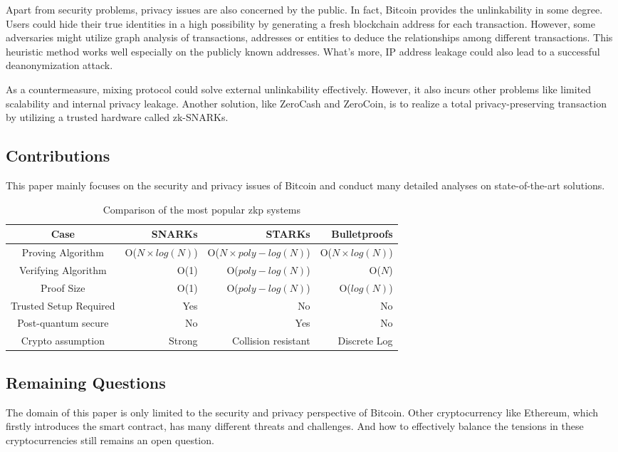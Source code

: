 \documentclass[conference]{IEEEtran}
\begin{document}
Apart from security problems, privacy issues are also concerned by the public.
%
In fact, Bitcoin provides the unlinkability in some degree.
%
Users could hide their true identities in a high possibility by generating a fresh blockchain address for each transaction.
%
However, some adversaries might utilize graph analysis of transactions, addresses or entities to deduce the relationships among different transactions.
%
This heuristic method works well especially on the publicly known addresses.
%
What's more, IP address leakage could also lead to a successful deanonymization attack.

As a countermeasure, mixing protocol could solve external unlinkability effectively.
%
However, it also incurs other problems like limited scalability and internal privacy leakage.
%
Another solution, like ZeroCash and ZeroCoin, is to realize a total privacy-preserving transaction by utilizing a trusted hardware called zk-SNARKs. 

\subsection{Contributions}
This paper mainly focuses on the security and privacy issues of Bitcoin and conduct many detailed analyses on state-of-the-art solutions.

\begin{table*}[!t]
    \caption{Comparison of the most popular zkp systems}
    \centering
    \begin{tabular}{c rrr}
        \hline \hline
        Case & SNARKs & STARKs & Bulletproofs \\
        \hline
        Proving Algorithm & O($N {\times} log(N)$) & O($N {\times} poly{-}log(N)$) & O($N {\times} log(N)$) \\
        Verifying Algorithm & O(1) & O($poly{-}log(N)$) & O($N$) \\
        Proof Size & O(1) & O($poly{-}log(N)$) & O($log(N)$) \\
        Trusted Setup Required & Yes & No & No \\
        Post-quantum secure & No & Yes & No \\
        Crypto assumption & Strong & Collision resistant & Discrete Log \\
        \hline
    \end{tabular}
    \label{compare}
\end{table*}

\subsection{Remaining Questions}
The domain of this paper is only limited to the security and privacy perspective of Bitcoin.
%
Other cryptocurrency like Ethereum, which firstly introduces the smart contract, has many different threats and challenges.
%
And how to effectively balance the tensions in these cryptocurrencies still remains an open question.
\end{document}
